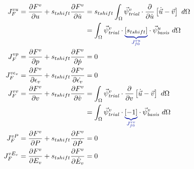 \begin{align}
    J_F^{vu} = \frac{\partial F^{v}}{\partial u} + s_{tshift} \frac{\partial F^{v}}{\partial \dot{u}}                                  & =
    s_{tshift} \int_{\Omega} \trialvec[v] \cdot \frac{\partial}{\partial \dot{u}} \left[\dot{\vec{u}} - \vec{v} \right] \ d\Omega                                                                                                                             \\
                                                                                                                                       & = \int_{\Omega} \trialvec[v] \cdot \eqnannotate{\left[ s_{tshift} \right]}{J_{f0}^{vu}} \cdot \basisvec[u] \ d\Omega \\
    J_F^{vp} = \frac{\partial F^{v}}{\partial p} + s_{tshift} \frac{\partial F^{v}}{\partial \dot{p}}                                  & = 0                                                                                                                  \\
    J_F^{v\epsilon_{v}} = \frac{\partial F^{v}}{\partial \epsilon_{v}} + s_{tshift} \frac{\partial F^{v}}{\partial \dot{\epsilon_{v}}} & = 0                                                                                                                  \\
    J_F^{vv} = \frac{\partial F^{v}}{\partial v} + s_{tshift} \frac{\partial F^{v}}{\partial \dot{v}}                                  & =
    \int_{\Omega} \trialvec[v] \cdot \frac{\partial}{\partial v} \left[ \dot{\vec{u}} - \vec{v} \right] \ d\Omega                                                                                                                                             \\
                                                                                                                                       & = \int_{\Omega} \trialvec[v] \cdot \eqnannotate{\left[ -1 \right]}{J_{f0}^{vv}} \cdot \basisvec[v] \ d\Omega         \\
    J_F^{v P} = \frac{\partial F^{v}}{\partial P} + s_{tshift} \frac{\partial F^{v}}{\partial \dot{P}}                                 & = 0                                                                                                                  \\
    J_F^{v E_{v}} = \frac{\partial F^{v}}{\partial E_{v}} + s_{tshift} \frac{\partial F^{v}}{\partial \dot{E}_{v}}                     & = 0
\end{align}

